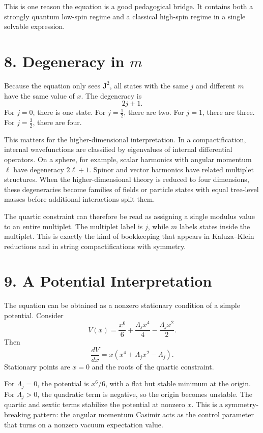 \documentclass[11pt]{article}
\newcommand{\Lspin}{\Lambda_j}
\begin{document}
This is one reason the equation is a good pedagogical bridge. It contains both a strongly quantum low-spin regime and a classical high-spin regime in a single solvable expression.


\section*{8. Degeneracy in \(m\)}

Because the equation only sees \(\mathbf{J}^2\), all states with the same \(j\) and different \(m\) have the same value of \(x\). The degeneracy is
\[
        2j+1 .
\]
For \(j=0\), there is one state. For \(j=\frac12\), there are two. For \(j=1\), there are three. For \(j=\frac32\), there are four.

This matters for the higher-dimensional interpretation. In a compactification, internal wavefunctions are classified by eigenvalues of internal differential operators. On a sphere, for example, scalar harmonics with angular momentum \(\ell\) have degeneracy \(2\ell+1\). Spinor and vector harmonics have related multiplet structures. When the higher-dimensional theory is reduced to four dimensions, these degeneracies become families of fields or particle states with equal tree-level masses before additional interactions split them.

The quartic constraint can therefore be read as assigning a single modulus value to an entire multiplet. The multiplet label is \(j\), while \(m\) labels states inside the multiplet. This is exactly the kind of bookkeeping that appears in Kaluza--Klein reductions and in string compactifications with symmetry.


\section*{9. A Potential Interpretation}

The equation can be obtained as a nonzero stationary condition of a simple potential. Consider
\begin{equation}
        V(x)=\frac{x^6}{6}+\frac{\Lspin x^4}{4}
        -\frac{\Lspin x^2}{2}.
        \label{eq:potential}
\end{equation}
Then
\begin{equation}
        \frac{dV}{dx}
        =
        x(x^4+\Lspin x^2-\Lspin).
\end{equation}
Stationary points are \(x=0\) and the roots of the quartic constraint.

For \(\Lspin=0\), the potential is \(x^6/6\), with a flat but stable minimum at the origin. For \(\Lspin>0\), the quadratic term is negative, so the origin becomes unstable. The quartic and sextic terms stabilize the potential at nonzero \(x\). This is a symmetry-breaking pattern: the angular momentum Casimir acts as the control parameter that turns on a nonzero vacuum expectation value.
\end{document}
